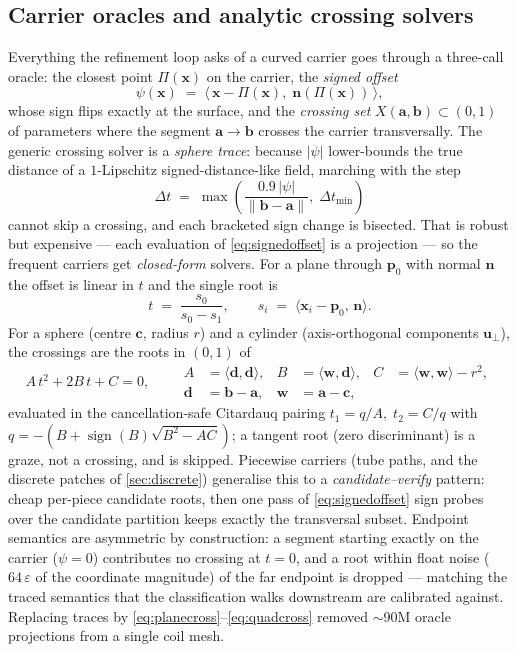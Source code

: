 \documentclass[11pt,a4paper]{article}
\numberwithin{equation}{section}
\newcommand{\vv}[1]{\mathbf{#1}}
\begin{document}
\subsection{Carrier oracles and analytic crossing solvers}
\label{sec:oracles}
Everything the refinement loop asks of a curved carrier goes through a
three-call oracle: the closest point $\Pi(\vv x)$ on the carrier, the
\emph{signed offset}
\begin{equation}
\psi(\vv x)\;=\;\bigl\langle\, \vv x-\Pi(\vv x),\; \vv n(\Pi(\vv x))\,\bigr\rangle,
\label{eq:signedoffset}
\end{equation}
whose sign flips exactly at the surface, and the \emph{crossing set}
$X(\vv a,\vv b)\subset(0,1)$ of parameters where the segment $\vv a\to\vv b$
crosses the carrier transversally. The generic crossing solver is a
\emph{sphere trace}: because $|\psi|$ lower-bounds the true distance of a
$1$-Lipschitz signed-distance-like field, marching with the step
\begin{equation}
\Delta t \;=\; \max\!\left(\frac{0.9\,\lvert\psi\rvert}{\lVert\vv b-\vv a\rVert},\;
\Delta t_{\min}\right)
\label{eq:spheretrace}
\end{equation}
cannot skip a crossing, and each bracketed sign change is bisected. That is
robust but expensive --- each evaluation of \eqref{eq:signedoffset} is a
projection --- so the frequent carriers get \emph{closed-form} solvers. For a
plane through $\vv p_0$ with normal $\vv n$ the offset is linear in $t$ and the
single root is
\begin{equation}
t \;=\; \frac{s_0}{s_0-s_1},\qquad
s_i \;=\; \bigl\langle \vv x_i-\vv p_0,\,\vv n \bigr\rangle .
\label{eq:planecross}
\end{equation}
For a sphere (centre $\vv c$, radius $r$) and a cylinder (axis-orthogonal
components $\vv u_\perp$), the crossings are the roots in $(0,1)$ of
\begin{equation}
A\,t^{2}+2B\,t+C=0,\qquad
\begin{aligned}
A&=\langle\vv d,\vv d\rangle, & B&=\langle\vv w,\vv d\rangle, &
C&=\langle\vv w,\vv w\rangle-r^{2},\\[-1pt]
\vv d&=\vv b-\vv a, & \vv w&=\vv a-\vv c, &&
\end{aligned}
\label{eq:quadcross}
\end{equation}
evaluated in the cancellation-safe Citardauq pairing
$t_{1}=q/A,\;t_{2}=C/q$ with $q=-(B+\operatorname{sign}(B)\sqrt{B^{2}-AC})$; a
tangent root (zero discriminant) is a graze, not a crossing, and is skipped.
Piecewise carriers (tube paths, and the discrete patches of
\cref{sec:discrete}) generalise this to a \emph{candidate--verify} pattern:
cheap per-piece candidate roots, then one pass of \eqref{eq:signedoffset} sign
probes over the candidate partition keeps exactly the transversal subset.
Endpoint semantics are asymmetric by construction: a segment starting exactly
on the carrier ($\psi=0$) contributes no crossing at $t=0$, and a root within
float noise ($64\,\varepsilon$ of the coordinate magnitude) of the far endpoint
is dropped --- matching the traced semantics that the classification walks
downstream are calibrated against. Replacing traces by
\eqref{eq:planecross}--\eqref{eq:quadcross} removed $\sim$90M oracle
projections from a single coil mesh.
\end{document}
